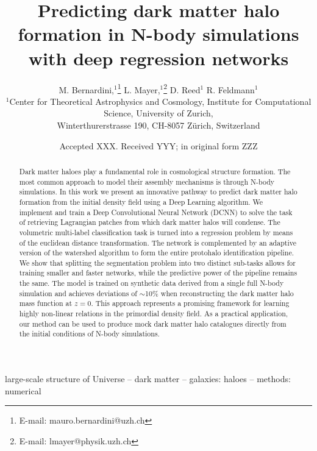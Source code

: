 \documentclass[fleqn,usenatbib]{mnras}
\title[A deep regression network for halo formation]{Predicting dark matter halo formation in N-body simulations with deep regression networks}
\author[M. Bernardini et al.]{
M. Bernardini,$^{1}$\thanks{E-mail: mauro.bernardini@uzh.ch}
L. Mayer,$^{1}$\thanks{E-mail: lmayer@physik.uzh.ch}
D. Reed$^{1}$
R. Feldmann$^{1}$
\\
$^{1}$Center for Theoretical Astrophysics and Cosmology, Institute for Computational Science, University of Zurich,\\
Winterthurerstrasse 190, CH-8057 Zürich, Switzerland\\
}
\date{Accepted XXX. Received YYY; in original form ZZZ}
\begin{document}
\label{firstpage}
\pagerange{\pageref{firstpage}--\pageref{lastpage}}
\maketitle

\begin{abstract}
Dark matter haloes play a fundamental role in cosmological structure formation. 
The most common approach to model their assembly mechanisms is through N-body simulations.
In this work we present an innovative pathway to predict dark matter halo formation from the initial density field using a Deep Learning algorithm. We implement and train a Deep Convolutional Neural Network (DCNN) to solve the task of retrieving Lagrangian patches from which dark matter halos will condense. 
The volumetric multi-label classification task is turned into a regression problem by means of the euclidean distance transformation. The network is complemented by an adaptive version of the watershed algorithm to form the entire protohalo identification pipeline. 
We show that splitting the segmentation problem into two distinct sub-tasks allows for training smaller and faster networks, while the predictive power of the pipeline remains the same. 
The model is trained on synthetic data derived from a single full N-body simulation and achieves deviations of $\sim$10\% when reconstructing the dark matter halo mass function at $z=0$. 
This approach represents a promising framework for learning highly non-linear relations in the primordial density field. As a practical application, our method can be used to produce mock dark matter halo catalogues directly from the initial conditions of N-body simulations.

\end{abstract}

\begin{keywords}
large-scale structure of Universe -- dark matter -- galaxies: haloes -- methods: numerical
\end{keywords}


\end{document}
